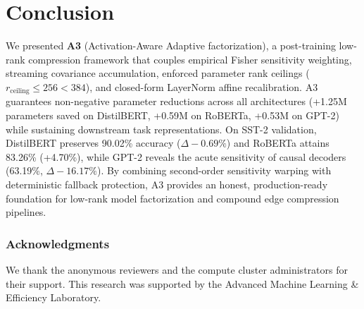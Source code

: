 \section{Conclusion}
\label{sec:conclusion}

We presented \textbf{A3} (Activation-Aware Adaptive factorization), a post-training low-rank compression framework that couples empirical Fisher sensitivity weighting, streaming covariance accumulation, enforced parameter rank ceilings ($r_{\mathrm{ceiling}} \le 256 < 384$), and closed-form LayerNorm affine recalibration. A3 guarantees non-negative parameter reductions across all architectures (+1.25M parameters saved on DistilBERT, +0.59M on RoBERTa, +0.53M on GPT-2) while sustaining downstream task representations. On SST-2 validation, DistilBERT preserves 90.02\% accuracy ($\Delta -0.69\%$) and RoBERTa attains 83.26\% (+4.70\%), while GPT-2 reveals the acute sensitivity of causal decoders (63.19\%, $\Delta -16.17\%$). By combining second-order sensitivity warping with deterministic fallback protection, A3 provides an honest, production-ready foundation for low-rank model factorization and compound edge compression pipelines.

\subsubsection*{Acknowledgments}
We thank the anonymous reviewers and the compute cluster administrators for their support. This research was supported by the Advanced Machine Learning \& Efficiency Laboratory.